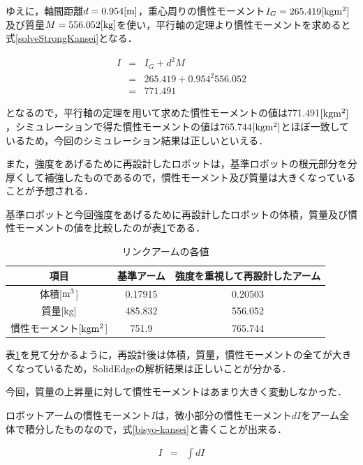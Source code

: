 ゆえに，軸間距離\(d=0.954[\rm m]\)，重心周りの慣性モーメント\(I_G=265.419[\rm kgm^2]\)及び質量\(M=556.052[\rm kg]\)を使い，平行軸の定理より慣性モーメントを求めると式\ref{solveStrongKansei}となる．

\begin{eqnarray}
  I &=& I_G+d^2M \nonumber \\
    &=& 265.419 + 0.954^{2} 556.052 \nonumber \\
    &=& 771.491
  \label{solveStrongKansei}
\end{eqnarray}

となるので，平行軸の定理を用いて求めた慣性モーメントの値は771.491\([\rm kgm^2]\)，シミュレーションで得た慣性モーメントの値は765.744\([\rm kgm^2]\)とほぼ一致しているため，今回のシミュレーション結果は正しいといえる．

また，強度をあげるために再設計したロボットは，基準ロボットの根元部分を分厚くして補強したものであるので，慣性モーメント及び質量は大きくなっていることが予想される．

基準ロボットと今回強度をあげるために再設計したロボットの体積，質量及び慣性モーメントの値を比較したのが表\ref{compare-basic-strong-mass}である．

\begin{table}[htb]
\caption[]{リンクアームの各値}
  \begin{center}
    \begin{tabular}{|c|c|c|} \hline
      項目 & 基準アーム & 強度を重視して再設計したアーム \\ \hline \hline
      体積[$\rm m^3$] & 0.17915 &0.20503 \\ \hline
      質量[kg] & 485.832 & 556.052 \\ \hline
      慣性モーメント[$\rm kg m^2$] & 751.9 & 765.744 \\ \hline
    \end{tabular}
    \label{compare-basic-strong-mass}
  \end{center}
\end{table}

表\ref{compare-basic-strong-mass}を見て分かるように，再設計後は体積，質量，慣性モーメントの全てが大きくなっているため，SolidEdgeの解析結果は正しいことが分かる．

今回，質量の上昇量に対して慣性モーメントはあまり大きく変動しなかった．

ロボットアームの慣性モーメント\(I\)は，微小部分の慣性モーメント\(dI\)をアーム全体で積分したものなので，式\ref{bisyo-kansei}と書くことが出来る．

\begin{eqnarray}
  I &=& \int dI
  \label{bisyo-kansei}
\end{eqnarray}

